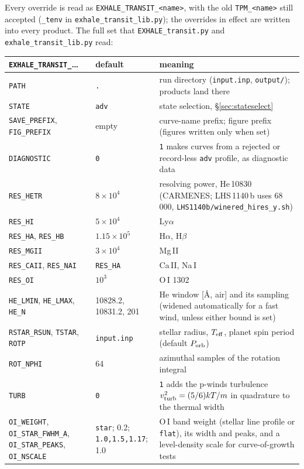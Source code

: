 \documentclass[english,a4paper]{my_memo}
\begin{document}
\begin{sloppypar}
Every override is read as \texttt{EXHALE\_TRANSIT\_<name>}, with the old
\texttt{TPM\_<name>} still accepted (\texttt{\_tenv} in
\texttt{exhale\_transit\_lib.py}); the overrides in effect are written into
every product. The full set that \texttt{EXHALE\_transit.py} and
\texttt{exhale\_transit\_lib.py} read:
\end{sloppypar}

\begin{center}\small
\begin{tabular}{@{}p{}p{}p{}@{}}
\toprule
\texttt{EXHALE\_TRANSIT\_}\ldots & default & meaning \\
\midrule
\texttt{PATH} & \texttt{.} & run directory (\texttt{input.inp},
  \texttt{output/}); products land there \\
\texttt{STATE} & \texttt{adv} & state selection, \S\ref{sec:stateselect} \\
\texttt{SAVE\_PREFIX}, \texttt{FIG\_PREFIX} & empty & curve-name prefix;
  figure prefix (figures written only when set) \\
\texttt{DIAGNOSTIC} & \texttt{0} & \texttt{1} makes curves from a rejected or
  record-less \texttt{adv} profile, as diagnostic data \\
\texttt{RES\_HETR} & $8\times10^4$ & resolving power, He\,10830 (CARMENES;
  LHS\,1140\,b uses 68\,000, \texttt{LHS1140b/winered\_hires\_y.sh}) \\
\texttt{RES\_HI} & $5\times10^4$ & Ly$\alpha$ \\
\texttt{RES\_HA}, \texttt{RES\_HB} & $1.15\times10^5$ & H$\alpha$, H$\beta$ \\
\texttt{RES\_MGII} & $3\times10^4$ & Mg\,II \\
\texttt{RES\_CAII}, \texttt{RES\_NAI} & \texttt{RES\_HA} & Ca\,II, Na\,I \\
\texttt{RES\_OI} & $10^3$ & O\,I 1302 \\
\texttt{HE\_LMIN}, \texttt{HE\_LMAX}, \texttt{HE\_N} & 10828.2, 10831.2, 201
  & He window [\AA, air] and its sampling (widened automatically for a fast
  wind, unless either bound is set) \\
\texttt{RSTAR\_RSUN}, \texttt{TSTAR}, \texttt{ROTP} & \texttt{input.inp} &
  stellar radius, $T_{\rm eff}$, planet spin period (default
  $P_{\rm orb}$) \\
\texttt{ROT\_NPHI} & 64 & azimuthal samples of the rotation integral \\
\texttt{TURB} & \texttt{0} & \texttt{1} adds the p-winds turbulence
  $v_{\rm turb}^2 = (5/6)kT/m$ in quadrature to the thermal width \\
\texttt{OI\_WEIGHT}, \texttt{OI\_STAR\_FWHM\_A}, \texttt{OI\_STAR\_PEAKS},
  \texttt{OI\_NSCALE} & \texttt{star}; 0.2; \texttt{1.0,1.5,1.17}; 1.0 & O\,I band
  weight (stellar line profile or \texttt{flat}), its width and peaks, and a
  level-density scale for curve-of-growth tests \\
\bottomrule
\end{tabular}
\end{center}
\end{document}
